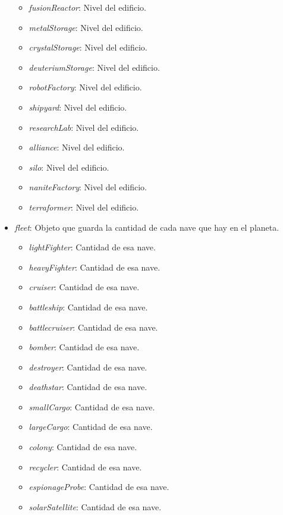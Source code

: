 \documentclass{article}
\begin{document}
\begin{itemize}[noitemsep]
\begin{itemize}[noitemsep]
        \item \textit{fusionReactor}: Nivel del edificio.
        \item \textit{metalStorage}: Nivel del edificio.
        \item \textit{crystalStorage}: Nivel del edificio.
        \item \textit{deuteriumStorage}: Nivel del edificio.
        \item \textit{robotFactory}: Nivel del edificio.
        \item \textit{shipyard}: Nivel del edificio.
        \item \textit{researchLab}: Nivel del edificio.
        \item \textit{alliance}: Nivel del edificio.
        \item \textit{silo}: Nivel del edificio.
        \item \textit{naniteFactory}: Nivel del edificio.
        \item \textit{terraformer}: Nivel del edificio.
    \end{itemize}
    \item \textit{fleet}: Objeto que guarda la cantidad de cada nave que hay en el planeta.
    \begin{itemize}[noitemsep]
        \item \textit{lightFighter}: Cantidad de esa nave.
        \item \textit{heavyFighter}: Cantidad de esa nave.
        \item \textit{cruiser}: Cantidad de esa nave.
        \item \textit{battleship}: Cantidad de esa nave.
        \item \textit{battlecruiser}: Cantidad de esa nave.
        \item \textit{bomber}: Cantidad de esa nave.
        \item \textit{destroyer}: Cantidad de esa nave.
        \item \textit{deathstar}: Cantidad de esa nave.
        \item \textit{smallCargo}: Cantidad de esa nave.
        \item \textit{largeCargo}: Cantidad de esa nave.
        \item \textit{colony}: Cantidad de esa nave.
        \item \textit{recycler}: Cantidad de esa nave.
        \item \textit{espionageProbe}: Cantidad de esa nave.
        \item \textit{solarSatellite}: Cantidad de esa nave.

\end{itemize}
\end{itemize}
\end{document}
